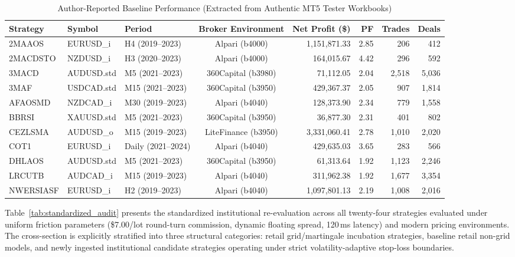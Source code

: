 \documentclass[11pt,a4paper]{article}
\begin{document}
\begin{table}[H]
\centering
\footnotesize
\setlength{\tabcolsep}{1.5pt}
\caption{Author-Reported Baseline Performance (Extracted from Authentic MT5 Tester Workbooks)}
\label{tab:author_baselines}
\begin{tabular*}{\textwidth}{@{\extracolsep{\fill}}lllcrrrr@{}}
\toprule
\textbf{Strategy} & \textbf{Symbol} & \textbf{Period} & \textbf{Broker Environment} & \textbf{Net Profit (\$)} & \textbf{PF} & \textbf{Trades} & \textbf{Deals} \\
\midrule
2MAAOS & EURUSD\_i & H4 (2019--2023) & Alpari (b4000) & 1,151,871.33 & 2.85 & 206 & 412 \\
2MACDSTO & NZDUSD\_i & H3 (2020--2023) & Alpari (b4000) & 164,015.67 & 4.42 & 296 & 592 \\
3MACD & AUDUSD.std & M5 (2021--2023) & 360Capital (b3980) & 71,112.05 & 2.04 & 2,518 & 5,036 \\
3MAF & USDCAD.std & M15 (2021--2023) & 360Capital (b3950) & 429,367.37 & 2.05 & 907 & 1,814 \\
AFAOSMD & NZDCAD\_i & M30 (2019--2023) & Alpari (b4040) & 128,373.90 & 2.34 & 779 & 1,558 \\
BBRSI & XAUUSD.std & M5 (2021--2023) & 360Capital (b3950) & 36,877.30 & 2.31 & 401 & 802 \\
CEZLSMA & AUDUSD\_o & M15 (2019--2023) & LiteFinance (b3950) & 3,331,060.41 & 2.78 & 1,010 & 2,020 \\
COT1 & EURUSD\_i & Daily (2021--2024) & Alpari (b4040) & 429,635.03 & 3.65 & 283 & 566 \\
DHLAOS & AUDUSD.std & M5 (2021--2023) & 360Capital (b3950) & 61,313.64 & 1.92 & 1,123 & 2,246 \\
LRCUTB & AUDCAD\_i & M15 (2019--2023) & Alpari (b4040) & 311,962.38 & 1.92 & 1,677 & 3,354 \\
NWERSIASF & EURUSD\_i & H2 (2019--2023) & Alpari (b4040) & 1,097,801.13 & 2.19 & 1,008 & 2,016 \\
\bottomrule
\end{tabular*}
\end{table}

Table~\ref{tab:standardized_audit} presents the standardized institutional re-evaluation across all twenty-four strategies evaluated under uniform friction parameters (\$7.00/lot round-turn commission, dynamic floating spread, 120\,ms latency) and modern pricing environments. The cross-section is explicitly stratified into three structural categories: retail grid/martingale incubation strategies, baseline retail non-grid models, and newly ingested institutional candidate strategies operating under strict volatility-adaptive stop-loss boundaries.
\end{document}
